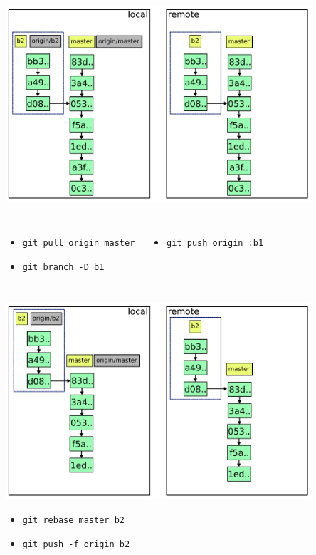 \documentclass{beamer}
\begin{document}
\begin{frame}{}
  \centering
  \includegraphics[width=0.85\textwidth]{img/8.pdf}
  \begin{columns}
  \begin{itemize}
  \small
  \item \lstinline|git pull origin master|
  \item \lstinline|git branch -D b1|
  \end{itemize}
  \begin{itemize}
  \small
  \item \lstinline|git push origin :b1|
  \end{itemize}
  \end{columns}
\end{frame}

\begin{frame}{}
  \centering
  \includegraphics[width=0.85\textwidth]{img/9.pdf}
  \begin{itemize}
  \small
  \item \lstinline|git rebase master b2|
  \item \lstinline|git push -f origin b2|
  \end{itemize}
\end{frame}
\end{document}

